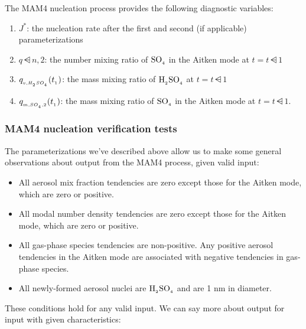 The MAM4 nucleation process provides the following diagnostic variables:

\begin{enumerate}
  \item $J^*$: the nucleation rate after the first and second (if applicable)
        parameterizations
  \item $q\dsub{n,2}$: the number mixing ratio of $\rm SO_{_4}$ in the Aitken mode at
        $t = t\dsub1$
  \item $q_{_{v,H_{_2}SO_{_4}}} (t_{_{1}})$: the mass mixing ratio of $\rm H_{_2}SO_{_4}$ at
        $t = t\dsub1$
  \item $q_{_{m,SO_{_4},2}} (t_{_{1}})$: the mass mixing ratio of $\rm SO_{_4}$ in the
        Aitken mode at $t = t\dsub1$.
\end{enumerate}


\subsubsection{MAM4 nucleation verification tests} 

The parameterizations we've described above allow us to make some general
observations about output from the MAM4 process, given valid input:

\begin{itemize}
  \item All aerosol mix fraction tendencies are zero except those for the Aitken
        mode, which are zero or positive.
  \item All modal number density tendencies are zero except those for the Aitken
        mode, which are zero or positive.
  \item All gas-phase species tendencies are non-positive. Any positive
        aerosol tendencies in the Aitken mode are associated with negative
        tendencies in gas-phase species.
  \item All newly-formed aerosol nuclei are $\rm H_{_2}SO_{_4}$ and are 1 nm in diameter.
\end{itemize}


These conditions hold for any valid input. We can say more about output for
input with given characteristics:


